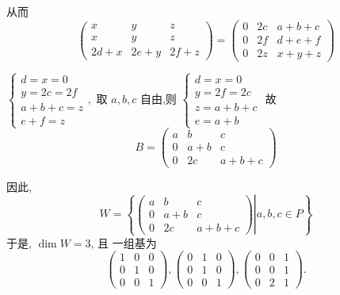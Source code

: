 \documentclass[13pt]{beamer}
\begin{document}
\begin{frame}
从而 
$$
\left(\begin{array}{ccc}
x & y & z \\
x & y & z \\
2 d+x & 2 e+y & 2 f+z
\end{array}\right)=\left(\begin{array}{ccc}
0 & 2 c & a+b+c \\
0 & 2 f & d+e+f \\
0 & 2 z & x+y+z
\end{array}\right)$$

$\left\{
\begin{array}{c}
d=x=0 \\
y=2 c=2 f \\
a+b+c=z \\
e+f=z
\end{array},
\right.$
取  $a, b, c$ 自由,则 
$
\left\{\begin{array}{c}
d=x=0 \\
y=2 f=2 c \\
z=a+b+c \\
e=a+b
\end{array}
\right.$
故 
$$B=\left(\begin{array}{ccc}
a & b & c \\
0 & a+b & c \\
0 & 2 c & a+b+c
\end{array}\right)$$
\end{frame}


\begin{frame}
因此,
$$W=\left\{\left. \left(\begin{array}{ccc}
a & b & c \\
0 & a+b & c \\
0 & 2 c & a+b+c
\end{array}\right) \right| a, b, c \in P\right\}$$
于是, $\operatorname{dim} W=3$,
且 一组基为 $$\left(\begin{array}{ccc}
1 & 0 & 0 \\
0 & 1 & 0 \\
0 & 0 & 1
\end{array}\right),\left(\begin{array}{ccc}
0 & 1 & 0 \\
0 & 1 & 0 \\
0 & 0 & 1
\end{array}\right),\left(\begin{array}{ccc}
0 & 0 & 1 \\
0 & 0 & 1 \\
0 & 2 & 1
\end{array}\right).$$
\end{frame}
\end{document}

